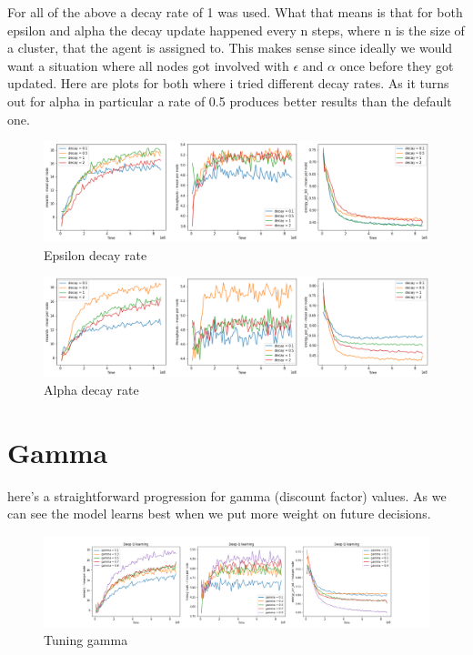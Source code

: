 For all of the above a decay rate of 1 was used. What
that means is that for both epsilon and alpha the decay 
update happened every n steps, where n is the size of 
a cluster, that the agent is assigned to. This makes 
sense since ideally we would want a situation where
all nodes got involved with $\epsilon$ and $\alpha$
once before they got updated. Here are plots for both where i tried different decay rates. As it turns out for alpha in particular a rate of 0.5 produces better results than the default 
one.

\begin{figure}[H]
\centering
\hspace*{-3.3cm}  
\includegraphics[scale=0.40]{plots/decays/epsilon_deep_q_SMALL.png}
  \caption{Epsilon decay rate}
\end{figure}

\begin{figure}[H]
\centering
\hspace*{-3.3cm}  
\includegraphics[scale=0.40]{plots/decays/alpha_deep_q_SMALL.png}
  \caption{Alpha decay rate}
\end{figure}

\section{Gamma}
here's a straightforward progression for gamma 
(discount factor) values. As we can see the model
learns best when we put more weight on future
decisions.

\begin{figure}[H]
\centering
\hspace*{-3.3cm}  
\includegraphics[scale=0.40]{plots/gamma/gamma_deep_q_SMALL.png}
  \caption{Tuning gamma}
\end{figure}


